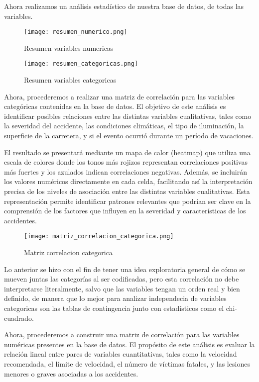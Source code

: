 \documentclass{book}
\begin{document}
Ahora realizamos un análisis estadístico de nuestra base de datos, de todas las variables.

\begin{figure}[h]
\centering
\texttt{[image: resumen\_numerico.png]}
\caption{\label{fig:resumen variables numericas}Resumen variables numericas}
\end{figure}

\begin{figure}[htbp]
\centering
\texttt{[image: resumen\_categoricas.png]}
\caption{\label{fig:resumen variables categoricas}Resumen variables categoricas}
\end{figure}

Ahora, procederemos a realizar una matriz de correlación para las variables categóricas contenidas en la base de datos. El objetivo de este análisis es identificar posibles relaciones entre las distintas variables cualitativas, tales como la severidad del accidente, las condiciones climáticas, el tipo de iluminación, la superficie de la carretera, y si el evento ocurrió durante un período de vacaciones.

El resultado se presentará mediante un mapa de calor (heatmap) que utiliza una escala de colores donde los tonos más rojizos representan correlaciones positivas más fuertes y los azulados indican correlaciones negativas. Además, se incluirán los valores numéricos directamente en cada celda, facilitando así la interpretación precisa de los niveles de asociación entre las distintas variables cualitativas. Esta representación permite identificar patrones relevantes que podrían ser clave en la comprensión de los factores que influyen en la severidad y características de los accidentes.

\begin{figure}[htbp]
\centering
\texttt{[image: matriz\_correlacion\_categorica.png]}
\caption{\label{fig:matriz correlacion categorica}Matriz correlacion categorica}
\end{figure}

Lo anterior se hizo con el fin de tener una idea exploratoria general de cómo se mueven juntas las categorías al ser codificadas, pero esta correlación no debe interpretarse literalmente, salvo que las variables tengan un orden real y bien definido, de manera que lo mejor para analizar independecia de variables categoricas son las tablas de contingencia junto con estadísticos como el chi-cuadrado.

Ahora, procederemos a construir una matriz de correlación para las variables numéricas presentes en la base de datos. El propósito de este análisis es evaluar la relación lineal entre pares de variables cuantitativas, tales como la velocidad recomendada, el límite de velocidad, el número de víctimas fatales, y las lesiones menores o graves asociadas a los accidentes.
\end{document}
